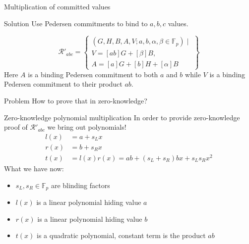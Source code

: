 \documentclass{zkdl-presentation-template}
\begin{document}
\begin{frame}{Multiplication of committed values}
    \begin{block}{Solution}
        Use Pedersen commitments to bind to $a,b,c$ values.
    \end{block}
    $$
        \mathcal{R}'_{abc} = \left\{\begin{array}{l}
            (G,H,B,A,V; a,b, \alpha, \beta \in \mathbb{F}_p) \mid \\
            V = [ab]G + [\beta]B, \\
            A = [a]G + [b]H + [\alpha]B
        \end{array}\right\}
    $$
    Here $A$ is a binding Pedersen commitment to both $a$ and $b$ while $V$ is a binding Pedersen commitment to their product $ab$.
    \begin{alertblock}{Problem}
        How to prove that in zero-knowledge?
    \end{alertblock}
\end{frame}

\begin{frame}{Zero-knowledge polynomial multiplication}
    In order to provide zero-knowledge proof of $\mathcal{R}'_{abc}$ we bring out polynomials!
    \begin{align*}
        l(x) &= a + s_L x\\
        r(x) &= b + s_R x\\
        t(x) &= l(x)r(x) = ab + (s_L + s_R)bx + s_Ls_Rx^2
    \end{align*}
    What we have now:
    \begin{itemize}
        \item $s_L, s_R \in \mathbb{F}_p$ are blinding factors
        \item $l(x)$ is a linear polynomial hiding value $a$
        \item $r(x)$ is a linear polynomial hiding value $b$
        \item $t(x)$ is a quadratic polynomial, constant term is the product $ab$
    \end{itemize}
\end{frame}
\end{document}
